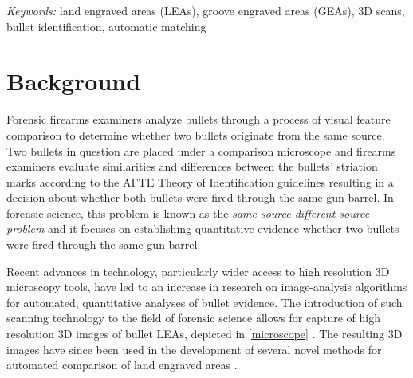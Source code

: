 \documentclass[12pt]{article}
\begin{document}
\noindent%
{\it Keywords:} land engraved areas (LEAs), groove engraved areas (GEAs), 3D scans, bullet identification, automatic matching
\vfill

\newpage
{} %

\newcommand{\hh}[1]{{\color{orange}{#1}}}
\newcommand{\kr}[1]{{\color{teal}{#1}}}
\newcommand{\ug}[1]{{\color{purple}{#1}}}





\section{Background}

Forensic firearms examiners analyze bullets through a process of visual
feature comparison to determine whether two bullets originate from the
same source. Two bullets in question are placed under a comparison
microscope and firearms examiners evaluate similarities and differences
between the bullets' striation marks according to the AFTE Theory of
Identification \citep{AFTE} guidelines resulting in a decision about
whether both bullets were fired through the same gun barrel. In forensic
science, this problem is known as the \emph{same source-different source
problem} and it focuses on establishing quantitative evidence whether
two bullets were fired through the same gun barrel.

Recent advances in technology, particularly wider access to high
resolution 3D microscopy tools, have led to an increase in research on
image-analysis algorithms for automated, quantitative analyses of bullet
evidence. The introduction of such scanning technology to the field of
forensic science allows for capture of high resolution 3D images of
bullet LEAs, depicted in \autoref{microscope}
\citep[see][]{DeKinder1, DeKinder2, Bachrach1}. The resulting 3D images
have since been used in the development of several novel methods for
automated comparison of land engraved areas
\citep[e.g.][]{Ma1, Chu1, Chu2, Hare1}.
\end{document}
